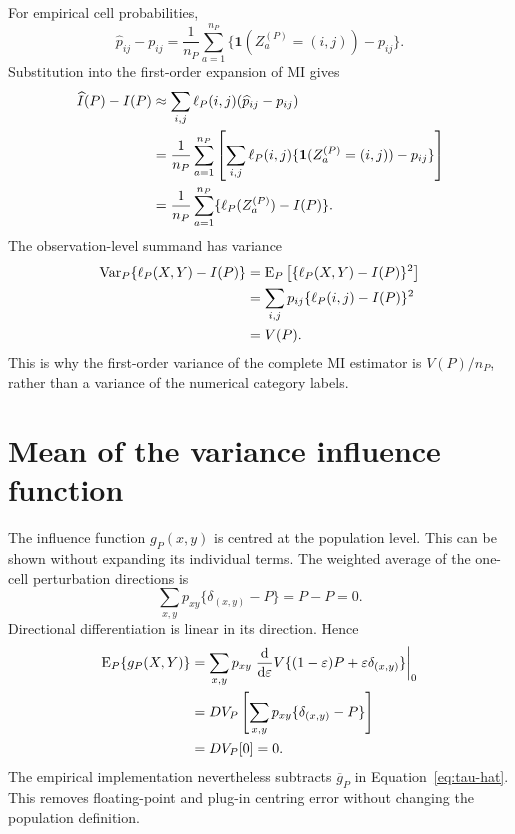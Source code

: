 For empirical cell probabilities,
\begin{equation}
  \widehat p_{ij}-p_{ij}
  =\frac{1}{n_P}\sum_{a=1}^{n_P}
  \{\mathbf 1(Z_a^{(P)}=(i,j))-p_{ij}\}.
\end{equation}
Substitution into the first-order expansion of MI gives
\begin{align}
  \widehat I(P)-I(P)
  &\approx
  \sum_{i,j}\ell_P(i,j)(\widehat p_{ij}-p_{ij})\\
  &=\frac{1}{n_P}\sum_{a=1}^{n_P}
  \left[
  \sum_{i,j}\ell_P(i,j)
  \{\mathbf 1(Z_a^{(P)}=(i,j))-p_{ij}\}
  \right]\\
  &=\frac{1}{n_P}\sum_{a=1}^{n_P}
  \{\ell_P(Z_a^{(P)})-I(P)\}.
  \label{eq:appendix-mi-linear}
\end{align}
The observation-level summand has variance
\begin{align}
  \operatorname{Var}_P\{\ell_P(X,Y)-I(P)\}
  &=\operatorname{E}_P\left[\{\ell_P(X,Y)-I(P)\}^2\right]\\
  &=\sum_{i,j}p_{ij}\{\ell_P(i,j)-I(P)\}^2\\
  &=V(P).
\end{align}
This is why the first-order variance of the complete MI estimator is
$V(P)/n_P$, rather than a variance of the numerical category labels.

\section{Mean of the variance influence function}

The influence function $g_P(x,y)$ is centred at the population level. This
can be shown without expanding its individual terms. The weighted average of
the one-cell perturbation directions is
\begin{equation}
  \sum_{x,y}p_{xy}\{\delta_{(x,y)}-P\}=P-P=0.
\end{equation}
Directional differentiation is linear in its direction. Hence
\begin{align}
  \operatorname{E}_P\{g_P(X,Y)\}
  &=\sum_{x,y}p_{xy}
    \left.\frac{\mathrm d}{\mathrm d\varepsilon}
    V\{(1-\varepsilon)P+\varepsilon\delta_{(x,y)}\}
    \right|_{0}\\
  &=D V_P\left[
    \sum_{x,y}p_{xy}\{\delta_{(x,y)}-P\}
    \right]\\
  &=D V_P[0]=0.
\end{align}
The empirical implementation nevertheless subtracts
$\overline g_P$ in Equation~\eqref{eq:tau-hat}. This removes floating-point
and plug-in centring error without changing the population definition.

